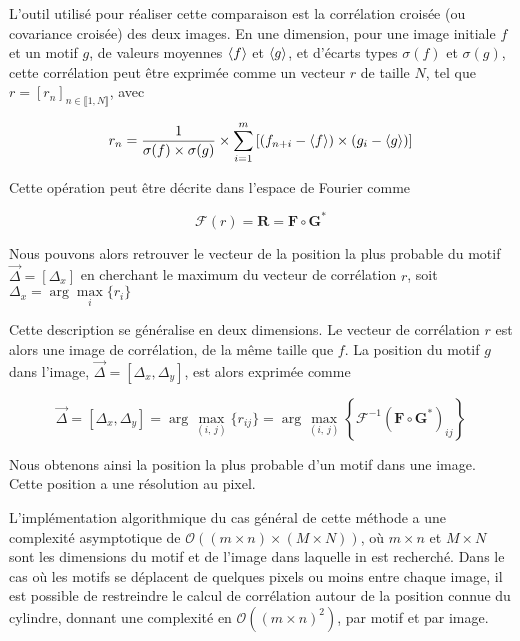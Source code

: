 L'outil utilisé pour réaliser cette comparaison est la corrélation croisée (ou covariance croisée) des deux images. En une dimension, pour une image initiale $f$ et un motif $g$, de valeurs moyennes $\left\langle {f} \right\rangle$ et $\left\langle {g} \right\rangle$, et d'écarts types $\sigma(f)$ et $\sigma(g)$, cette corrélation peut être exprimée comme un vecteur $r$ de taille $N$, tel que $r=[r_n]_{n\in\llbracket 1,N\rrbracket}$, avec

\begin{equation}
r_n=\dfrac{1}{\sigma(f)\times\sigma(g)}\times \sum\limits_{i=1}^m\left[
			( f_{n+i}-\left\langle {f} \right\rangle )
				\times
			( g_i-\left\langle {g} \right\rangle )\right]
\end{equation}

Cette opération peut être décrite dans l'espace de Fourier comme

\begin{equation}
\mathcal{F}(r) = \mathbf{R} = \mathbf{F}\circ\mathbf{G}^*
\end{equation}

Nous pouvons alors retrouver le vecteur de la position la plus probable du motif $\vec{\Delta}=\left[\Delta_x\right]$ en cherchant le maximum du vecteur de corrélation $r$, soit $\Delta_x = \arg\max\limits_i\{r_i\}$


Cette description se généralise en deux dimensions. Le vecteur de corrélation $r$ est alors une image de corrélation, de la même taille que $f$. La position du motif $g$ dans l'image, $\vec{\Delta}=[\Delta_x,\Delta_y]$, est alors exprimée comme

\begin{equation}
\vec{\Delta} = [\Delta_x,\Delta_y]
	   = \arg\max\limits_{(i,\,j)}\{r_{ij}\}
	   = \arg\max\limits_{(i,\,j)}\left\{
		   \mathcal{F}^{-1}
			   \left(
				   \mathbf{F}\circ\mathbf{G}^*
			   \right)_{ij}
		\right\}
\end{equation}


Nous obtenons ainsi la position la plus probable d'un motif dans une image. Cette position a une résolution au pixel.

L'implémentation algorithmique du cas général de cette méthode a une complexité asymptotique de $\mathcal{O}\left((m\times n) \times \allowbreak(M\times N)\right)$, où $m\times n$ et $M\times N$ sont les dimensions du motif et de l'image dans laquelle in est recherché. Dans le cas où les motifs se déplacent de quelques pixels ou moins entre chaque image, il est possible de restreindre le calcul de corrélation autour de la position connue du cylindre, donnant une complexité en $\mathcal{O}((m\times n)^2)$, par motif et par image.



